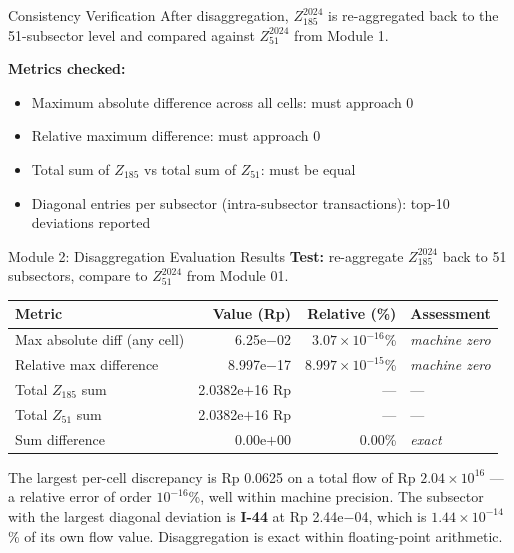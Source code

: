 \documentclass[aspectratio=169]{beamer}
\begin{document}
\begin{frame}{Consistency Verification}
After disaggregation, $Z_{185}^{2024}$ is re-aggregated back to the 51-subsector level and compared against $Z_{51}^{2024}$ from Module 1.

\medskip
\textbf{Metrics checked:}
\begin{itemize}
  \item Maximum absolute difference across all cells: must approach 0
  \item Relative maximum difference: must approach 0
  \item Total sum of $Z_{185}$ vs total sum of $Z_{51}$: must be equal
  \item Diagonal entries per subsector (intra-subsector transactions): top-10 deviations reported
\end{itemize}
\end{frame}

\begin{frame}{Module 2: Disaggregation Evaluation Results}
\textbf{Test:} re-aggregate $Z_{185}^{2024}$ back to 51 subsectors, compare to $Z_{51}^{2024}$ from Module 01.

\medskip
\begin{center}
\renewcommand{\arraystretch}{1.3}
\begin{tabular}{lrrl}
\toprule
\textbf{Metric} & \textbf{Value (Rp)} & \textbf{Relative (\%)} & \textbf{Assessment} \\
\midrule
Max absolute diff (any cell) & 6.25e$-$02 & $3.07 \times 10^{-16}$\% & \textit{machine zero} \\
Relative max difference      & 8.997e$-$17 & $8.997\times10^{-15}$\% & \textit{machine zero} \\
Total $Z_{185}$ sum          & 2.0382e$+$16 Rp & --- & --- \\
Total $Z_{51}$ sum           & 2.0382e$+$16 Rp & --- & --- \\
Sum difference               & 0.00e$+$00 & 0.00\% & \textit{exact} \\
\bottomrule
\end{tabular}
\end{center}

\medskip
\small
The largest per-cell discrepancy is Rp 0.0625 on a total flow of Rp $2.04 \times 10^{16}$ --- a relative error of order $10^{-16}$\%, well within machine precision. The subsector with the largest diagonal deviation is \textbf{I-44} at Rp 2.44e$-$04, which is $1.44 \times 10^{-14}$\% of its own flow value. Disaggregation is exact within floating-point arithmetic.
\end{frame}
\end{document}

